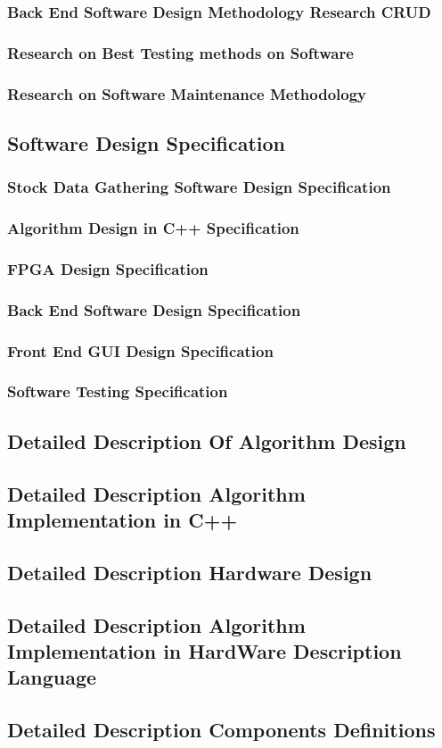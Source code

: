 \documentclass{sig-alternate}
\begin{document}
	     \subsubsection{Back End Software Design Methodology Research CRUD}
	     \subsubsection{Research on Best Testing methods on Software}
	     \subsubsection{Research on Software Maintenance Methodology}
     \subsection{Software Design Specification}
	     \subsubsection{Stock Data Gathering Software Design Specification}
	     \subsubsection{Algorithm Design in C++ Specification} 
	     \subsubsection{FPGA Design Specification} 
	     \subsubsection{Back End Software Design Specification} 
	     \subsubsection{Front End GUI Design Specification} 
	     \subsubsection{Software Testing Specification} 
     \subsection{Detailed Description Of Algorithm Design}
		     \subsection{Detailed Description Algorithm Implementation in C++} 
     \subsection{Detailed Description Hardware Design}
	     \subsection{Detailed Description Algorithm Implementation in HardWare Description Language} 
		     \subsection{Detailed Description Components Definitions}

	
    
\end{document}
